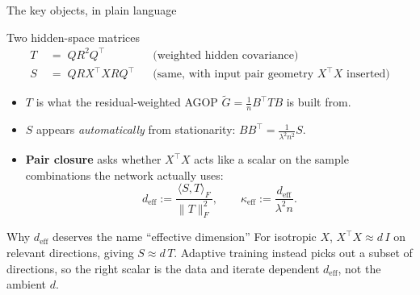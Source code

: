 \documentclass[10pt,aspectratio=169]{beamer}
\newcommand{\hl}[1]{{\color{nicered}\textbf{#1}}}
\newcommand{\T}{^{\!\top}}
\newcommand{\Gw}{\widetilde{G}}
\begin{document}
\begin{frame}{The key objects, in plain language}
  \footnotesize
  \begin{ibox}{Two hidden-space matrices}
    \begin{align*}
      T \;&=\; QR^2Q\T &&\text{(weighted hidden covariance)} \\[1pt]
      S \;&=\; QRX\T X RQ\T &&\text{(same, with input pair geometry $X\T X$ inserted)}
    \end{align*}
  \end{ibox}
  \vspace{4pt}
  \begin{itemize}\setlength\itemsep{3pt}
    \item $T$ is what the residual-weighted AGOP $\Gw = \tfrac{1}{n}B\T T B$ is built from.
    \item $S$ appears \emph{automatically} from stationarity: $BB\T = \tfrac{1}{\lambda^2 n^2} S$.
    \item \hl{Pair closure} asks whether $X\T X$ acts like a scalar on the sample combinations the network actually uses:
    \[ d_{\mathrm{eff}} := \frac{\langle S, T\rangle_F}{\|T\|_F^2}, \qquad \kappa_{\mathrm{eff}} := \frac{d_{\mathrm{eff}}}{\lambda^2 n}. \]
  \end{itemize}
  \begin{ibox}{Why $d_{\mathrm{eff}}$ deserves the name ``effective dimension''}
    For isotropic $X$, $X\T X \approx d\,I$ on relevant directions, giving $S \approx d\,T$. Adaptive training instead picks out a subset of directions, so the right scalar is the data and iterate dependent $d_{\mathrm{eff}}$, not the ambient $d$.
  \end{ibox}
\end{frame}
\end{document}
